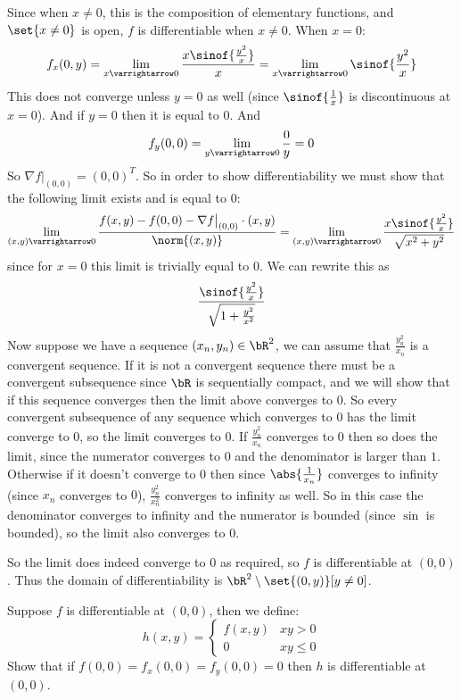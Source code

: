 \documentclass[10pt]{article}
\begin{document}
\begin{blankpp}
        \item Since when $x\neq0$, this is the composition of elementary functions, and $\set{x\neq0}$ is open, $f$ is differentiable when $x\neq0$.
        When $x=0$:
        \[ f_x(0,y) = \lim_{x\varrightarrow0}\frac{x\sinof{\frac{y^2}x}}x = \lim_{x\varrightarrow0}\sinof{\frac{y^2}x} \]
        This does not converge unless $y=0$ as well (since $\sinof{\frac1x}$ is discontinuous at $x=0$).
        And if $y=0$ then it is equal to $0$.
        And
        \[ f_y(0,0) = \lim_{y\varrightarrow0}\frac{0}y = 0 \]
        So $\nabla f\big|_{(0,0)}=(0,0)^T$.
        So in order to show differentiability we must show that the following limit exists and is equal to $0$:
        \[ \lim_{(x,y)\varrightarrow0}\frac{f(x,y)-f(0,0)-\nabla f\big|_{(0,0)}\cdot(x,y)}{\norm{(x,y)}} = \lim_{(x,y)\varrightarrow0}\frac{x\sinof{\frac{y^2}x}}{\sqrt{x^2+y^2}} \]
        since for $x=0$ this limit is trivially equal to $0$.
        We can rewrite this as
        \[ \frac{\sinof{\frac{y^2}x}}{\sqrt{1+\frac{y^2}{x^2}}} \]
        Now suppose we have a sequence $(x_n,y_n)\in\bR^2$, we can assume that $\frac{y_n^2}{x_n}$ is a convergent sequence.
        If it is not a convergent sequence there must be a convergent subsequence since $\bR$ is sequentially compact, and we will show that if this sequence converges then the limit above converges to $0$.
        So every convergent subsequence of any sequence which converges to $0$ has the limit converge to $0$, so the limit converges to $0$.
        If $\frac{y_n^2}{x_n}$ converges to $0$ then so does the limit, since the numerator converges to $0$ and the denominator is larger than $1$.
        Otherwise if it doesn't converge to $0$ then since $\abs{\frac1{x_n}}$ converges to infinity (since $x_n$ converges to $0$), $\frac{y_n^2}{x_n^2}$ converges to infinity as well.
        So in this case the denominator converges to infinity and the numerator is bounded (since $\sin$ is bounded), so the limit also converges to $0$.

        So the limit does indeed converge to $0$ as required, so $f$ is differentiable at $(0,0)$.
        Thus the domain of differentiability is $\bR^2\setminus\set{(0,y)}[y\neq0]$.
    \eenum

\end{blankpp}

\begin{exercise*}

    Suppose $f$ is differentiable at $(0,0)$, then we define:
    \[ h(x,y) = \begin{cases} f(x,y) & xy>0 \\ 0 & xy\leq0 \end{cases} \]
    Show that if $f(0,0)=f_x(0,0)=f_y(0,0)=0$ then $h$ is differentiable at $(0,0)$.

\end{exercise*}
\end{document}
